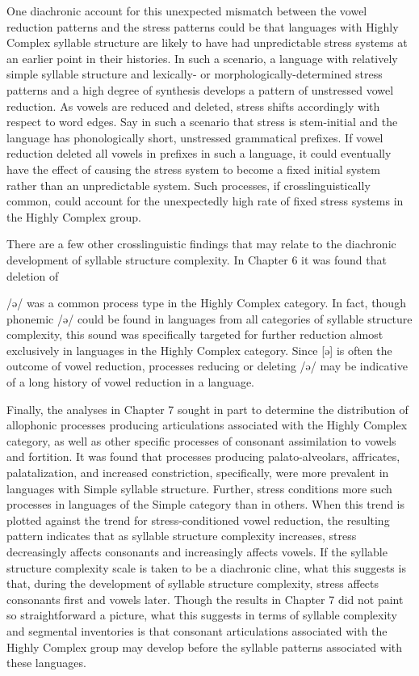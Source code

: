   One diachronic account for this unexpected mismatch between the vowel reduction patterns and the stress patterns could be that languages with Highly Complex syllable structure are likely to have had unpredictable stress systems at an earlier point in their histories. In such a scenario, a language with relatively simple syllable structure and lexically- or morphologically-determined stress patterns and a high degree of synthesis develops a pattern of unstressed vowel reduction. As vowels are reduced and deleted, stress shifts accordingly with respect to word edges. Say in such a scenario that stress is stem-initial and the language has phonologically short, unstressed grammatical prefixes. If vowel reduction deleted all vowels in prefixes in such a language, it could eventually have the effect of causing the stress system to become a fixed initial system rather than an unpredictable system. Such processes, if crosslinguistically common, could account for the unexpectedly high rate of fixed stress systems in the Highly Complex group.



  There are a few other crosslinguistic findings that may relate to the diachronic development of syllable structure complexity. In Chapter 6 it was found that deletion of 



/ə/ was a common process type in the Highly Complex category. In fact, though phonemic /ə/ could be found in languages from all categories of syllable structure complexity, this sound was specifically targeted for further reduction almost exclusively in languages in the Highly Complex category. Since [ə] is often the outcome of vowel reduction, processes reducing or deleting /ə/ may be indicative of a long history of vowel reduction in a language.



  Finally, the analyses in Chapter 7 sought in part to determine the distribution of allophonic processes producing articulations associated with the Highly Complex category, as well as other specific processes of consonant assimilation to vowels and fortition. It was found that processes producing palato-alveolars, affricates, palatalization, and increased constriction, specifically, were more prevalent in languages with Simple syllable structure. Further, stress conditions more such processes in languages of the Simple category than in others. When this trend is plotted against the trend for stress-conditioned vowel reduction, the resulting pattern indicates that as syllable structure complexity increases, stress decreasingly affects consonants and increasingly affects vowels. If the syllable structure complexity scale is taken to be a diachronic cline, what this suggests is that, during the development of syllable structure complexity, stress affects consonants first and vowels later. Though the results in Chapter 7 did not paint so straightforward a picture, what this suggests in terms of syllable complexity and segmental inventories is that consonant articulations associated with the Highly Complex group may develop before the syllable patterns associated with these languages.



